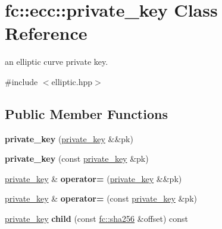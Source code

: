 \hypertarget{classfc_1_1ecc_1_1private__key}{}\section{fc\+:\+:ecc\+:\+:private\+\_\+key Class Reference}
\label{classfc_1_1ecc_1_1private__key}


an elliptic curve private key.  




{\ttfamily \#include $<$elliptic.\+hpp$>$}

\subsection*{Public Member Functions}
\begin{DoxyCompactItemize}
\item 
\mbox{\label{classfc_1_1ecc_1_1private__key_af661dbffcc6ab52220a9d1ce1ed2cf52}} 
{\bfseries private\+\_\+key} (\mbox{\hyperlink{classfc_1_1ecc_1_1private__key}{private\+\_\+key}} \&\&pk)
\item 
\mbox{\label{classfc_1_1ecc_1_1private__key_a5f83d375d76ffc530accc51fd22a1c20}} 
{\bfseries private\+\_\+key} (const \mbox{\hyperlink{classfc_1_1ecc_1_1private__key}{private\+\_\+key}} \&pk)
\item 
\mbox{\label{classfc_1_1ecc_1_1private__key_a35e700049a1b301202a45bb4e46e8240}} 
\mbox{\hyperlink{classfc_1_1ecc_1_1private__key}{private\+\_\+key}} \& {\bfseries operator=} (\mbox{\hyperlink{classfc_1_1ecc_1_1private__key}{private\+\_\+key}} \&\&pk)
\item 
\mbox{\label{classfc_1_1ecc_1_1private__key_a2cec7b462875dee7ccaa51d94185d9fa}} 
\mbox{\hyperlink{classfc_1_1ecc_1_1private__key}{private\+\_\+key}} \& {\bfseries operator=} (const \mbox{\hyperlink{classfc_1_1ecc_1_1private__key}{private\+\_\+key}} \&pk)
\item 
\mbox{\label{classfc_1_1ecc_1_1private__key_a40b27d62eab21bdff688d45b4ef2b6a1}} 
\mbox{\hyperlink{classfc_1_1ecc_1_1private__key}{private\+\_\+key}} {\bfseries child} (const \mbox{\hyperlink{classfc_1_1sha256}{fc\+::sha256}} \&offset) const

\end{DoxyCompactItemize}
